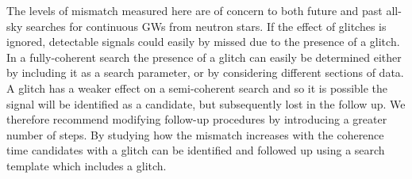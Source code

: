 \documentclass[../full_thesis/full_thesis.tex]{subfiles}
\begin{document}
The levels of mismatch measured here are of concern to both future and past
all-sky searches for continuous GWs from neutron stars. If the effect of
glitches is ignored, detectable signals could easily by missed due to the
presence of a glitch. In a fully-coherent search the presence of a glitch can
easily be determined either by including it as a search parameter, or by
considering different sections of data. A glitch has a weaker effect on a
semi-coherent search and so it is possible the signal will be identified as a
candidate, but subsequently lost in the follow up.  We therefore recommend
modifying follow-up procedures by introducing a greater number of steps. By
studying how the mismatch increases with the coherence time candidates with a
glitch can be identified and followed up using a search template which includes
a glitch.

\end{document}
